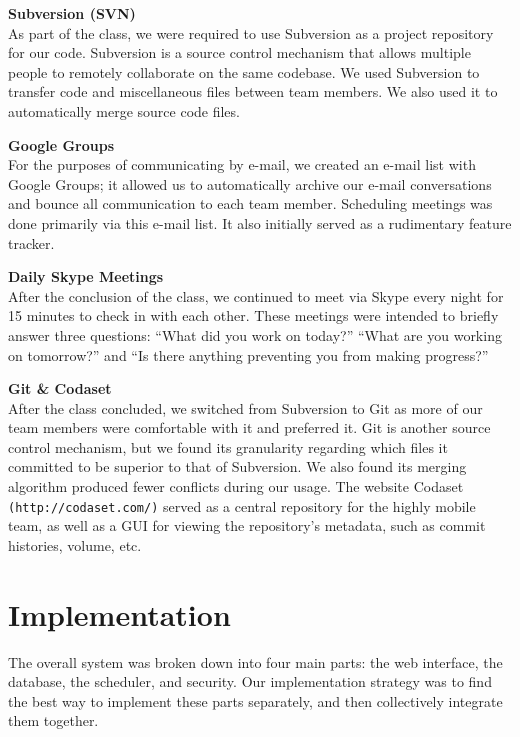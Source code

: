 \documentclass[12pt]{article}
\begin{document}
\begin{description}
\item{\textbf{Subversion (SVN)}} \\As part of the class, we were required to use Subversion as a project repository for our code. Subversion is a source control mechanism that allows multiple people to remotely collaborate on the same codebase. We used Subversion to transfer code and miscellaneous files between team members. We also used it to automatically merge source code files.
\item{\textbf{Google Groups}} \\For the purposes of communicating by e-mail, we created an e-mail list with Google Groups; it allowed us to automatically archive our e-mail conversations and bounce all communication to each team member. Scheduling meetings was done primarily via this e-mail list. It also initially served as a rudimentary feature tracker.
\item{\textbf{Daily Skype Meetings}} \\After the conclusion of the class, we continued to meet via Skype every night for 15 minutes to check in with each other. These meetings were intended to briefly answer three questions: ``What did you work on today?'' ``What are you working on tomorrow?'' and ``Is there anything preventing you from making progress?''
\item{\textbf{Git \& Codaset}} \\After the class concluded, we switched from Subversion to Git as more of our team members were comfortable with it and preferred it. Git is another source control mechanism, but we found its granularity regarding which files it committed to be superior to that of Subversion. We also found its merging algorithm produced fewer conflicts during our usage. The website Codaset \texttt{(http://codaset.com/)} served as a central repository for the highly mobile team, as well as a GUI for viewing the repository's metadata, such as commit histories, volume, etc.
\end{description}

\section{Implementation} %

The overall system was broken down into four main parts: the web interface, the database, the scheduler, and security. Our implementation strategy was to find the best way to implement these parts separately, and then collectively integrate them together.
\end{document}
